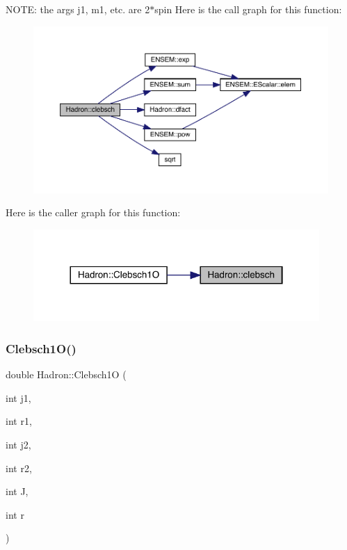 N\+O\+TE\+: the args j1, m1, etc. are 2$\ast$spin Here is the call graph for this function\+:
\nopagebreak
\begin{figure}[H]
\begin{center}
\leavevmode
\includegraphics[width=350pt]{d1/daf/namespaceHadron_ac4cba1d4aa3863fdc7991c208b3b9594_cgraph}
\end{center}
\end{figure}
Here is the caller graph for this function\+:
\nopagebreak
\begin{figure}[H]
\begin{center}
\leavevmode
\includegraphics[width=308pt]{d1/daf/namespaceHadron_ac4cba1d4aa3863fdc7991c208b3b9594_icgraph}
\end{center}
\end{figure}
\mbox{\label{namespaceHadron_a78e0e843ad34636504d3ab3f2280e5e5}} 
\subsubsection{\texorpdfstring{Clebsch1O()}{Clebsch1O()}}
{\footnotesize\ttfamily double Hadron\+::\+Clebsch1O (\begin{DoxyParamCaption}\item[{int}]{j1,  }\item[{int}]{r1,  }\item[{int}]{j2,  }\item[{int}]{r2,  }\item[{int}]{J,  }\item[{int}]{r }\end{DoxyParamCaption})}




